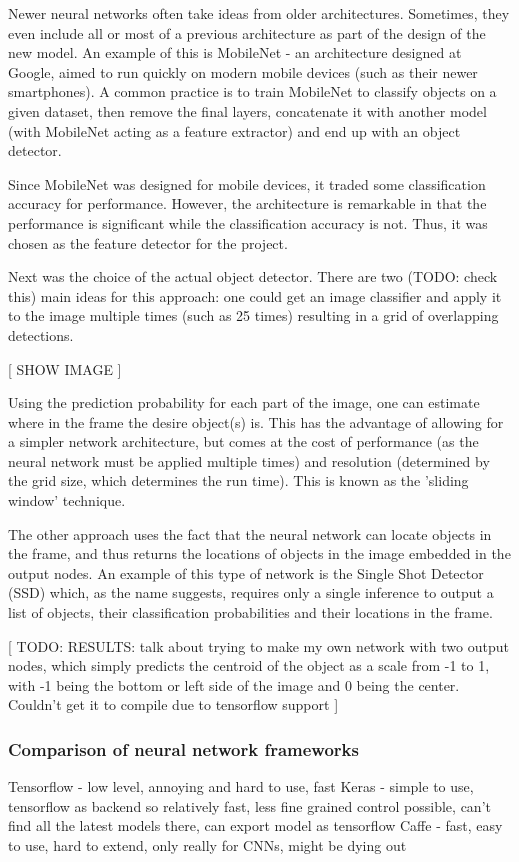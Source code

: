 Newer neural networks often take ideas from older architectures. Sometimes, they even include all or most of a previous architecture as part of the design of the new model. An example of this is MobileNet - an architecture designed at Google, aimed to run quickly on modern mobile devices (such as their newer smartphones). A common practice is to train MobileNet to classify objects on a given dataset, then remove the final layers, concatenate it with another model (with MobileNet acting as a feature extractor) and end up with an object detector.

Since MobileNet was designed for mobile devices, it traded some classification accuracy for performance. However, the architecture is remarkable in that the performance is significant while the classification accuracy is not. Thus, it was chosen as the feature detector for the project.

Next was the choice of the actual object detector. There are two (TODO: check this) main ideas for this approach: one could get an image classifier and apply it to the image multiple times (such as 25 times) resulting in a grid of overlapping detections.

[ SHOW IMAGE ]

Using the prediction probability for each part of the image, one can estimate where in the frame the desire object(s) is. This has the advantage of allowing for a simpler network architecture, but comes at the cost of performance (as the neural network must be applied multiple times) and resolution (determined by the grid size, which determines the run time). This is known as the 'sliding window' technique.

The other approach uses the fact that the neural network can locate objects in the frame, and thus returns the locations of objects in the image embedded in the output nodes. An example of this type of network is the Single Shot Detector (SSD) which, as the name suggests, requires only a single inference to output a list of objects, their classification probabilities and their locations in the frame.

[ TODO: RESULTS: talk about trying to make my own network with two output nodes, which simply predicts the centroid of the object as a scale from -1 to 1, with -1 being the bottom or left side of the image and 0 being the center. Couldn't get it to compile due to tensorflow support ]

\subsubsection{Comparison of neural network frameworks}
Tensorflow - low level, annoying and hard to use, fast
Keras - simple to use, tensorflow as backend so relatively fast, less fine grained control possible, can't find all the latest models there, can export model as tensorflow
Caffe - fast, easy to use, hard to extend, only really for CNNs, might be dying out
